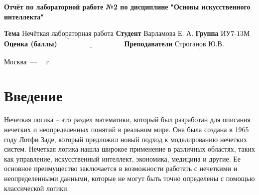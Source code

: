 \documentclass[12pt]{report}
\begin{document}
\begin{titlepage}
	
	\begin{center}
		\noindent\begin{minipage}{1.3\textwidth}\centering
			\Large\textbf{  Отчёт по лабораторной работе №2 по дисциплине}\newline
			\textbf{ "Основы искусственного интеллекта"}\newline\newline
		\end{minipage}
	\end{center}
	
	\noindent\textbf{Тема} $\underline{\text{Нечёткая лабораторная работа}}$\newline\newline
	\noindent\textbf{Студент} $\underline{\text{Варламова Е. А.}}$\newline\newline
	\noindent\textbf{Группа} $\underline{\text{ИУ7-13М}}$\newline\newline
	\noindent\textbf{Оценка (баллы)} $\underline{\text{~~~~~~~~~~~~~~~~~~~~~~~~~~~}}$\newline\newline
	\noindent\textbf{Преподаватели} $\underline{\text{Строганов Ю.В.}}$\newline\newline\newline
	
	\begin{center}
		\vfill
		Москва~---~\the\year
		~г.
	\end{center}
\end{titlepage}
\large
\setcounter{page}{2}
\def\contentsname{СОДЕРЖАНИЕ}
\renewcommand{\contentsname}{СОДЕРЖАНИЕ}
\tableofcontents
\renewcommand\labelitemi{---}
\newpage
\chapter*{Введение}

Нечеткая логика -- это раздел математики, который был разработан для описания нечетких и неопределенных понятий в реальном мире. 
Она была создана в 1965 году Лотфи Заде, который предложил новый подход к моделированию нечетких систем. 
Нечеткая логика нашла широкое применение в различных областях, таких как управление, искусственный интеллект, экономика, медицина и другие. 
Ее основное преимущество заключается в возможности работать с нечеткими и неопределенными данными, которые не могут быть точно определены с помощью классической логики.
\end{document}
